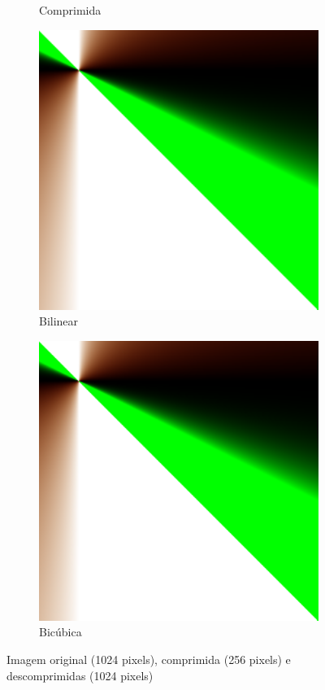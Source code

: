 \documentclass{article}
\begin{document}
\begin{figure}[ht]
\begin{subfigure}{0.23\textwidth}
    \caption{Comprimida}
  \end{subfigure}%
  \hfill
  \begin{subfigure}{0.23\textwidth}
    \centering
    \includegraphics[width=\textwidth]{polinomial/h-1/decompressed-bilinear.png}
    \caption{Bilinear}
  \end{subfigure}%
  \hfill
  \begin{subfigure}{0.23\textwidth}
    \centering
    \includegraphics[width=\textwidth]{polinomial/h-1/decompressed-bicubica.png}
    \caption{Bicúbica}
  \end{subfigure}
  \caption{Imagem original (1024 pixels), comprimida (256 pixels) e descomprimidas (1024 pixels)}
\end{figure}
\end{document}
